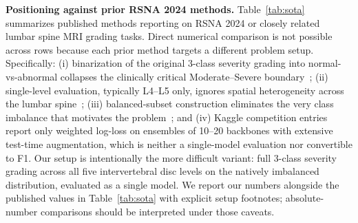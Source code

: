 \documentclass[conference]{IEEEtran}
\begin{document}
\textbf{Positioning against prior RSNA 2024 methods.}
Table~\ref{tab:sota} summarizes published methods reporting on RSNA
2024 or closely related lumbar spine MRI grading tasks. Direct
numerical comparison is not possible across rows because each prior
method targets a different problem setup. Specifically: (i)
binarization of the original 3-class severity grading into
normal-vs-abnormal collapses the clinically critical Moderate--Severe
boundary~\cite{lin2024cbam,aktan2025}; (ii) single-level evaluation,
typically L4--L5 only, ignores spatial heterogeneity across the lumbar
spine~\cite{lin2024cbam}; (iii) balanced-subset construction
eliminates the very class imbalance that motivates the
problem~\cite{lin2024cbam,aktan2025,phaphuangwittayakul2026}; and (iv)
Kaggle competition entries report only weighted log-loss on ensembles
of 10--20 backbones with extensive test-time augmentation, which is
neither a single-model evaluation nor convertible to F1. Our setup is
intentionally the more difficult variant: full 3-class severity
grading across all five intervertebral disc levels on the natively
imbalanced distribution, evaluated as a single model. We report our
numbers alongside the published values in Table~\ref{tab:sota} with
explicit setup footnotes; absolute-number comparisons should be
interpreted under those caveats.
\end{document}
